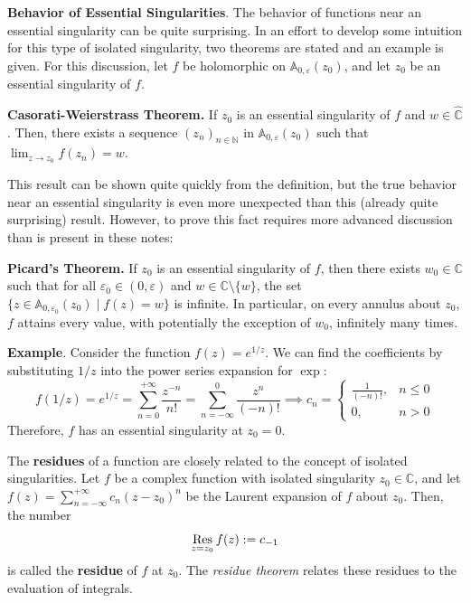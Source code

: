 \begin{shaded}
    \textbf{Behavior of Essential Singularities}. The behavior of functions near an essential singularity can be quite surprising. In an effort to develop some intuition for this type of isolated singularity, two theorems are stated and an example is given. For this discussion, let $f$ be holomorphic on $\mathbb{A}_{0,\varepsilon}(z_0)$, and let $z_0$ be an essential singularity of $f$.

    \textbf{Casorati-Weierstrass Theorem.} If $z_0$ is an essential singularity of $f$ and $w\in \hat{\mathbb{C}}$. Then, there exists a sequence $(z_n)_{n\in\mathbb{N}}$ in $\mathbb{A}_{0,\varepsilon}(z_0)$ such that $\displaystyle\lim_{z\to z_0} f(z_n) = w$.

    This result can be shown quite quickly from the definition, but the true behavior near an essential singularity is even more unexpected than this (already quite surprising) result. However, to prove this fact requires more advanced discussion than is present in these notes:

    \textbf{Picard's Theorem.} If $z_0$ is an essential singularity of $f$, then there exists $w_0\in\mathbb{C}$ such that for all $\varepsilon_0\in (0,\varepsilon)$ and $w\in \mathbb{C}\setminus\{w\}$, the set $\{z\in \mathbb{A}_{0,\varepsilon_0}(z_0)\mid f(z)=w\}$ is infinite. In particular, on every annulus about $z_0$, $f$ attains every value, with potentially the exception of $w_0$, infinitely many times.

    \textbf{Example}. Consider the function $f(z)=e^{1/z}$. We can find the coefficients by substituting $1/z$ into the power series expansion for $\exp$: \[f(1/z) = e^{1/z} = \sum_{n=0}^{+\infty}\frac{z^{-n}}{n!} = \sum_{n=-\infty}^0 \frac{z^n}{(-n)!} \implies c_n = \begin{cases}
        \frac{1}{(-n)!}, & n\leq 0\\
        0, & n > 0
    \end{cases}\] Therefore, $f$ has an essential singularity at $z_0=0$.
\end{shaded}

The \textbf{residues} of a function are closely related to the concept of isolated singularities. Let $f$ be a complex function with isolated singularity $z_0\in\mathbb{C}$, and let $f(z) = \sum_{n=-\infty}^{+\infty} c_n (z-z_0)^n$ be the Laurent expansion of $f$ about $z_0$. Then, the number \[\mathop{\mathrm{Res}}_{z=z_0} f(z) := c_{-1}\] is called the \textbf{residue} of $f$ at $z_0$. The \textit{residue theorem} relates these residues to the evaluation of integrals.


